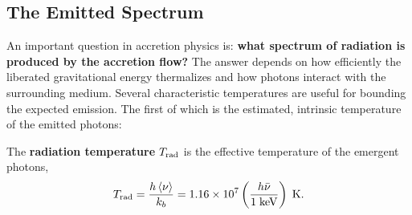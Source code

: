 \subsection{The Emitted Spectrum}

An important question in accretion physics is: \textbf{what spectrum of radiation is produced by the accretion flow?}  The answer depends on how efficiently the liberated gravitational energy thermalizes and how photons interact with the surrounding medium.  Several characteristic temperatures are useful for bounding the expected emission. The first of which is the estimated, intrinsic temperature of the emitted photons:
\vspace{0.5cm}
\begin{definition}
\label{def:rad_temperature}
The \textbf{radiation temperature} $T_{\rm rad}$ is the effective temperature of the emergent photons,
\begin{equation}
    \label{eq:rad_temp}
    T_{\rm rad} = \frac{h\left<\nu\right>}{k_b} = 1.16\times 10^{7} \left(\frac{h\bar{\nu}}{1\;{\rm keV}}\right)\;{\rm K}.
\end{equation}
\end{definition}
\vspace{0.5cm}


